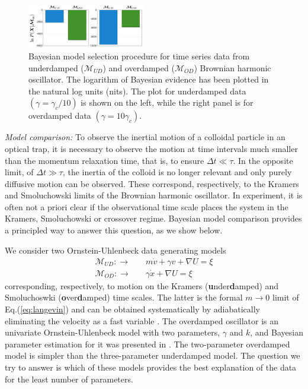 \documentclass[english,aps, twocolumn, pre,superscriptaddress, notitlepage]{revtex4-1}
\begin{document}
\begin{figure}[t]
\includegraphics[width=0.46\textwidth]{Fig4.png}

\caption{Bayesian model selection procedure for time series data from underdamped
($\mathcal{M}_{UD}$) and overdamped ($\mathcal{M}_{OD}$) Brownian
harmonic oscillator. The logarithm of Bayesian evidence has been plotted
in the natural log units (nits). The plot for underdamped data $(\gamma=\gamma_{c}/10)$
is shown on the left, while the right panel is for overdamped data
$(\gamma=10\gamma_{c})$.\label{fig:modelSelection} }
\end{figure}

\emph{Model comparison: }To observe the inertial motion of a colloidal
particle in an optical trap, it is necessary to observe the motion
at time intervals much smaller than the momentum relaxation time,
that is, to ensure $\Delta t\ll\tau$. In the opposite limit, of $\Delta t\gg\tau$,
the inertia of the colloid is no longer relevant and only purely diffusive
motion can be observed. These correspond, respectively, to the Kramers
and Smoluchowski limits of the Brownian harmonic oscillator. In experiment,
it is often not a priori clear if the observational time scale places
the system in the Kramers, Smoluchowski or crossover regime. Bayesian
model comparison provides a principled way to answer this question,
as we show below. 

We consider two Ornstein-Uhlenbeck data generating models
\begin{align}
\mathcal{M}_{UD}:\longrightarrow & \quad m\dot{v}+\gamma v+\nabla U=\xi\nonumber \\
\mathcal{M}_{OD}:\longrightarrow & \quad\gamma\dot{x}+\nabla U=\xi
\end{align}
corresponding, respectively, to motion on the Kramers\textbf{\emph{
}}(\textbf{u}nder\textbf{d}amped) and Smoluchoswki (\textbf{o}ver\textbf{d}amped)
time scales. The latter is the formal $m\rightarrow0$ limit of Eq.(\ref{eq:langevin})
and can be obtained systematically by adiabatically eliminating the
velocity as a fast variable \cite{gardiner1984adiabatic}. The overdamped
oscillator is an univariate Ornstein-Uhlenbeck model with two parameters,
$\gamma$ and $k$, and Bayesian parameter estimation for it was presented
in \cite{bera2017fast}. The two-parameter overdamped model is simpler
than the three-parameter underdamped model. The question we try to
answer is which of these models provides the best explanation of the
data for the least number of parameters. 
\end{document}
